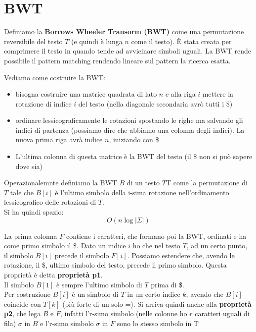 \documentclass[a4paper,12pt, oneside]{book}
\begin{document}
\section{BWT}
\begin{definizione}
  Definiamo la \textbf{Borrows Wheeler Transorm (BWT)} come una permutazione
  reversibile del testo $T$ (e quindi è lunga $n$ come il testo). È stata creata
  per comprimere il testo in quando tende ad avvicinare simboli uguali. La BWT
  rende possibile il pattern matching rendendo lineare sul pattern la ricerca
  esatta. 
\end{definizione}
Vediamo come costruire la BWT:
\begin{itemize}
  \item bisogna costruire una matrice quadrata di lato $n$ e alla riga $i$
  mettere la rotazione di indice $i$ del testo (nella diagonale secondaria avrò
  tutti i \$)
  \item ordinare lessicograficamente le rotazioni spostando le righe ma
  salvando gli indici di partenza (possiamo dire che abbiamo una colonna degli
  indici). La nuova prima riga avrà indice $n$, iniziando con \$
  \item L'ultima colonna di questa matrice è la BWT del testo (il \$ non si può
  sapere dove sia)
\end{itemize}
\begin{definizione}
  Operazionalemnte definiamo
  la BWT $B$ di un testo $T$T come la permutazione di $T$ tale che $B[i]$ è
  l'ultimo simbolo della i-sima rotazione nell'ordinamento lessicografico delle
  rotazioni di $T$.
  \\
  Si ha quindi spazio:
  \[O(n \log |\Sigma|)\]
\end{definizione}
La prima colonna $F$ contiene i caratteri, che formano poi la BWT, ordinati e ha
come primo simbolo il \$. Dato un indice $i$ ho che nel testo $T$, ad un certo
punto, il simbolo $B[i]$ precede il simbolo $F[i]$. Possiamo estendere che,
avendo le rotazione, il \$, ultimo simbolo del testo, precede il primo
simbolo. Questa proprietà è detta \textbf{proprietà p1}.\\
Il simbolo $B[1]$ è sempre l'ultimo simbolo di $T$ prima di \$. \\
Per costruzione
$B[i]$ è un simbolo di $T$ in un certo indice $k$, avendo che $B[i]$ coincide
con $T[k]$ (più forte di un solo =). Si arriva quindi anche alla
\textbf{proprietà p2}, che lega $B$ e $F$, infatti l'r-simo simbolo (nelle
colonne ho $r$ caratteri uguali di fila)
$\sigma$ in $B$ e l'r-simo simbolo $\sigma$ in $F$ sono lo stesso simbolo in T
\end{document}
